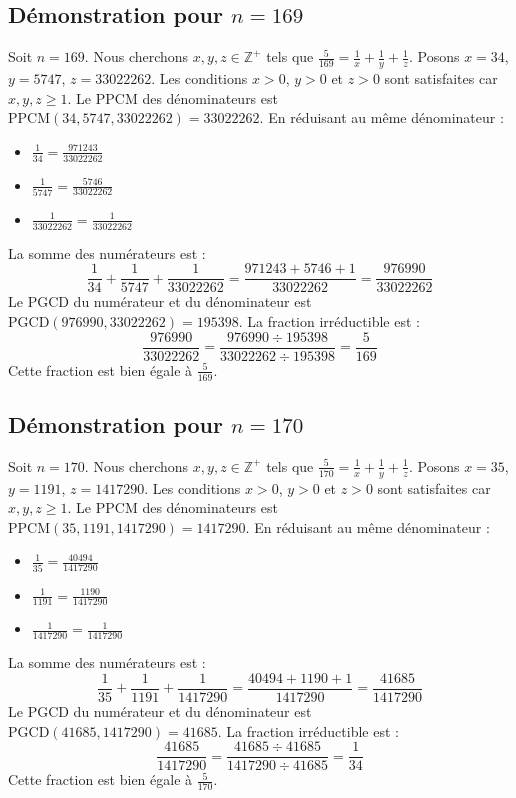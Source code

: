 \documentclass[11pt,a4paper]{article}
\begin{document}
\subsection{Démonstration pour $n = 169$}
Soit $n = 169$. Nous cherchons $x, y, z \in \mathbb{Z}^{+}$ tels que $\frac{5}{169} = \frac{1}{x} + \frac{1}{y} + \frac{1}{z}$.
Posons $x = 34$, $y = 5747$, $z = 33022262$.
Les conditions $x > 0$, $y > 0$ et $z > 0$ sont satisfaites car $x, y, z \geq 1$.
Le PPCM des dénominateurs est $\text{PPCM}(34, 5747, 33022262) = 33022262$.
En réduisant au même dénominateur :
\begin{itemize}
    \item $\frac{1}{34} = \frac{971243}{33022262}$
    \item $\frac{1}{5747} = \frac{5746}{33022262}$
    \item $\frac{1}{33022262} = \frac{1}{33022262}$
\end{itemize}
La somme des numérateurs est :
$$ \frac{1}{34} + \frac{1}{5747} + \frac{1}{33022262} = \frac{971243 + 5746 + 1}{33022262} = \frac{976990}{33022262} $$
Le PGCD du numérateur et du dénominateur est $\text{PGCD}(976990, 33022262) = 195398$.
La fraction irréductible est :
$$ \frac{976990}{33022262} = \frac{976990 \div 195398}{33022262 \div 195398} = \frac{5}{169} $$
Cette fraction est bien égale à $\frac{5}{169}$.

\subsection{Démonstration pour $n = 170$}
Soit $n = 170$. Nous cherchons $x, y, z \in \mathbb{Z}^{+}$ tels que $\frac{5}{170} = \frac{1}{x} + \frac{1}{y} + \frac{1}{z}$.
Posons $x = 35$, $y = 1191$, $z = 1417290$.
Les conditions $x > 0$, $y > 0$ et $z > 0$ sont satisfaites car $x, y, z \geq 1$.
Le PPCM des dénominateurs est $\text{PPCM}(35, 1191, 1417290) = 1417290$.
En réduisant au même dénominateur :
\begin{itemize}
    \item $\frac{1}{35} = \frac{40494}{1417290}$
    \item $\frac{1}{1191} = \frac{1190}{1417290}$
    \item $\frac{1}{1417290} = \frac{1}{1417290}$
\end{itemize}
La somme des numérateurs est :
$$ \frac{1}{35} + \frac{1}{1191} + \frac{1}{1417290} = \frac{40494 + 1190 + 1}{1417290} = \frac{41685}{1417290} $$
Le PGCD du numérateur et du dénominateur est $\text{PGCD}(41685, 1417290) = 41685$.
La fraction irréductible est :
$$ \frac{41685}{1417290} = \frac{41685 \div 41685}{1417290 \div 41685} = \frac{1}{34} $$
Cette fraction est bien égale à $\frac{5}{170}$.
\end{document}
